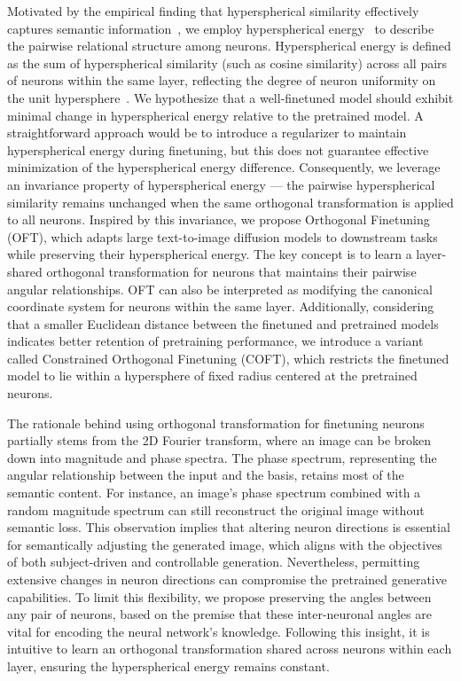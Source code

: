 Motivated by the empirical finding that hyperspherical similarity effectively captures semantic information~\cite{liu2017deep,liu2018decoupled,chen2020angular}, we employ hyperspherical energy~\cite{liu2018learning} to describe the pairwise relational structure among neurons. Hyperspherical energy is defined as the sum of hyperspherical similarity (such as cosine similarity) across all pairs of neurons within the same layer, reflecting the degree of neuron uniformity on the unit hypersphere~\cite{liu2021learning}. We hypothesize that a well-finetuned model should exhibit minimal change in hyperspherical energy relative to the pretrained model. A straightforward approach would be to introduce a regularizer to maintain hyperspherical energy during finetuning, but this does not guarantee effective minimization of the hyperspherical energy difference. Consequently, we leverage an invariance property of hyperspherical energy — the pairwise hyperspherical similarity remains unchanged when the same orthogonal transformation is applied to all neurons. Inspired by this invariance, we propose Orthogonal Finetuning (OFT), which adapts large text-to-image diffusion models to downstream tasks while preserving their hyperspherical energy. The key concept is to learn a layer-shared orthogonal transformation for neurons that maintains their pairwise angular relationships. OFT can also be interpreted as modifying the canonical coordinate system for neurons within the same layer. Additionally, considering that a smaller Euclidean distance between the finetuned and pretrained models indicates better retention of pretraining performance, we introduce a variant called Constrained Orthogonal Finetuning (COFT), which restricts the finetuned model to lie within a hypersphere of fixed radius centered at the pretrained neurons.

The rationale behind using orthogonal transformation for finetuning neurons partially stems from the 2D Fourier transform, where an image can be broken down into magnitude and phase spectra. The phase spectrum, representing the angular relationship between the input and the basis, retains most of the semantic content. For instance, an image's phase spectrum combined with a random magnitude spectrum can still reconstruct the original image without semantic loss. This observation implies that altering neuron directions is essential for semantically adjusting the generated image, which aligns with the objectives of both subject-driven and controllable generation. Nevertheless, permitting extensive changes in neuron directions can compromise the pretrained generative capabilities. To limit this flexibility, we propose preserving the angles between any pair of neurons, based on the premise that these inter-neuronal angles are vital for encoding the neural network’s knowledge. Following this insight, it is intuitive to learn an orthogonal transformation shared across neurons within each layer, ensuring the hyperspherical energy remains constant.

